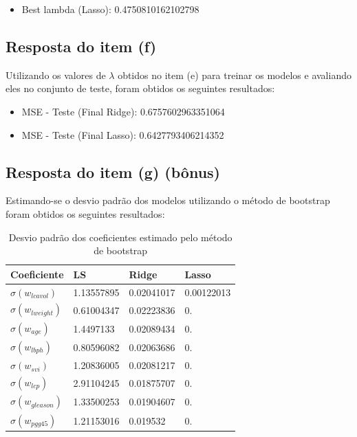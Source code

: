 \begin{itemize}
    \item Best lambda (Lasso): 0.4750810162102798
\end{itemize}

\subsection{Resposta do item (f)}
Utilizando os valores de $\lambda$ obtidos no item (e) para treinar os modelos e avaliando eles no conjunto de teste, foram obtidos os seguintes resultados:

\begin{itemize}
    \item MSE - Teste (Final Ridge): 0.6757602963351064
    \item MSE - Teste (Final Lasso): 0.6427793406214352
\end{itemize}

\subsection{Resposta do item (g) (bônus)}
Estimando-se o desvio padrão dos modelos utilizando o método de bootstrap foram obtidos os seguintes resultados:

\begin{table}[H]
    \caption{Desvio padrão dos coeficientes estimado pelo método de bootstrap}
    \centering
        \begin{tabular}{|l|lll|}
            \toprule
            Coeficiente & LS & Ridge & Lasso \\
            \midrule
            $\sigma(w_{lcavol})$ & 1.13557895 & 0.02041017 & 0.00122013 \\
            $\sigma(w_{lweight})$ & 0.61004347 & 0.02223836 & 0. \\
            $\sigma(w_{age})$ & 1.4497133 & 0.02089434 & 0. \\
            $\sigma(w_{lbph})$ & 0.80596082 & 0.02063686 & 0. \\
            $\sigma(w_{svi})$ & 1.20836005 & 0.02081217 & 0. \\
            $\sigma(w_{lcp})$ & 2.91104245 & 0.01875707 & 0. \\
            $\sigma(w_{gleason})$ & 1.33500253 & 0.01904607 & 0. \\
            $\sigma(w_{pgg45})$ & 1.21153016 & 0.019532 & 0. \\
            \bottomrule
        \end{tabular}
\end{table}






